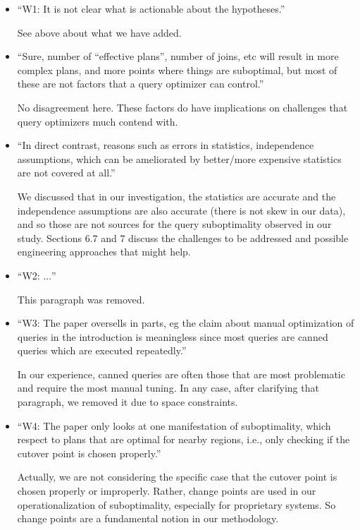 \documentclass{sig-alternate}
\begin{document}
\vspace{2ex}
\begin{itemize}
\item ``W1: It is not clear what is actionable about the hypotheses.''

See above about what we have added.

\item ``Sure, number of ``effective plans'', number of joins, etc will
  result in more complex plans, and more points where things are suboptimal,
  but most of these are not factors that a query optimizer can control.''\

No disagreement here. These factors do have implications on challenges that
query optimizers much contend with.

\newpage
\item ``In direct contrast, reasons such as errors in statistics,
  independence assumptions, which can be ameliorated by better/more
  expensive statistics are not covered at all.''

We discussed that in our investigation, the statistics are accurate and the
independence assumptions are also accurate (there is not skew in our data),
and so those are not sources for the query suboptimality observed in our
study. Sections 6.7 and 7 discuss the challenges to be addressed and possible
engineering approaches that might help.

\item ``W2: $\ldots$''

This paragraph was removed.

\item ``W3: The paper oversells in parts, eg the claim about manual
  optimization of queries in the introduction is meaningless since most
  queries are canned queries which are executed repeatedly.''

In our experience, canned queries are often those that are most problematic
and require the most manual tuning. In any case, after clarifying that
paragraph, we removed it due to space constraints.

\item ``W4: The paper only looks at one manifestation of suboptimality,
  which respect to plans that are optimal for nearby regions, i.e., only
  checking if the cutover point is chosen properly.''

Actually, we are not considering the specific case that the cutover point is
chosen properly or improperly. Rather, change points are used in our 
operationalization of suboptimality, especially for proprietary systems. So
change points are a fundamental notion in our methodology.


\end{itemize}
\end{document}
